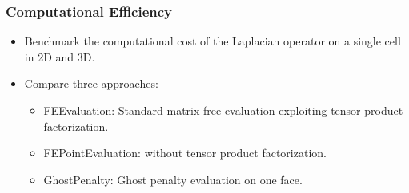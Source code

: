 \documentclass{beamer}
\begin{document}
\begin{frame}
    \frametitle{Computational Efficiency}
    \begin{itemize}
        \item Benchmark the computational cost of the Laplacian operator on a single cell in 2D and 3D.
        \item Compare three approaches:
              \begin{itemize}
                  \item FEEvaluation: Standard matrix-free evaluation exploiting tensor product factorization.
                  \item FEPointEvaluation: without  tensor product factorization.
                  \item GhostPenalty: Ghost penalty evaluation on one face.
              \end{itemize}
    \end{itemize}
\end{frame}
\end{document}

